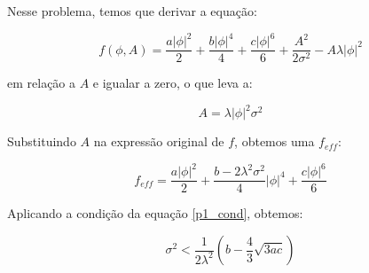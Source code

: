 Nesse problema, temos que derivar a equação:

\begin{equation}
f(\phi,A) = \frac{a |\phi|^{2}}{2} + \frac{b |\phi|^{4}}{4} + \frac{c |\phi|^{6}}{6} + \frac{A^{2}}{2 \sigma^{2}} - A \lambda |\phi|^{2}
\end{equation}

em relação a $A$ e igualar a zero, o que leva a:

\begin{equation}
A = \lambda |\phi|^{2} \sigma^{2}
\end{equation}

Substituindo $A$ na expressão original de $f$, obtemos uma $f_{eff}$:

\begin{equation}
f_{eff} = \frac{a |\phi|^{2}}{2} + \frac{b - 2 \lambda^{2} \sigma^{2} }{4}|\phi|^{4} + \frac{c |\phi|^{6}}{6}
\end{equation}

Aplicando a condição da equação \eqref{p1_cond}, obtemos:

\begin{equation}
\sigma^2 < \frac{1}{2\lambda^2} \left( b - \frac{4}{3}\sqrt{3ac} \right)
\end{equation}